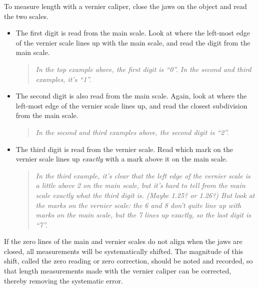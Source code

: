 To measure length with a vernier caliper, close the jaws on the object and read the two scales.
\begin{itemize}
\item The first digit is read from the main scale.  Look at where the left-most edge of the vernier scale lines up with the main scale, and read the digit from the main scale.  

\begin{quote}
\textit{In the top example above, the first digit is ``0''.  
In the second and third examples, it's ``1''.}
\end{quote}
\item The second digit is also read from the main scale.  Again, look at where the left-most edge of the vernier scale lines up, and read the closest subdivision from the main scale.  

\begin{quote}
\textit{In the second and third examples above, the second digit is ``2''.}
\end{quote}

\item The third digit is read from the vernier scale.  Read which mark on the vernier scale lines up \textit{exactly} with a mark above it on the main scale. 

\begin{quote}
\textit{In the third example, it's clear that the left edge of the vernier scale is a little above 2 on the main scale, but it's hard to tell from the main scale exactly what the third digit is.  (Maybe 1.25? or 1.26?)  But look at the marks on the vernier scale: the 6 and 8 don't quite line up with marks on the main scale, but the 7 lines up exactly, so the last digit is ``7''.}
\end{quote}
\end{itemize}

If the zero lines of the main and vernier scales do not align when the jaws are closed, all measurements will be systematically shifted. The magnitude of this shift, called the zero reading or zero correction, should be noted and recorded, so that length measurements made with the vernier caliper can be corrected, thereby removing the systematic error.

